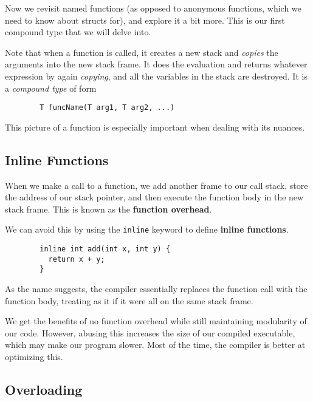 \documentclass{article}
\begin{document}
    Now we revisit named functions (as opposed to anonymous functions, which we need to know about structs for), and explore it a bit more. This is our first compound type that we will delve into. 

    \begin{definition}
      Note that when a function is called, it creates a new stack and \textit{copies} the arguments into the new stack frame. It does the evaluation and returns whatever expression by again \textit{copying}, and all the variables in the stack are destroyed. It is a \textit{compound type} of form 
      \begin{lstlisting}
        T funcName(T arg1, T arg2, ...)
      \end{lstlisting}
    \end{definition}

    This picture of a function is especially important when dealing with its nuances. 
  
  \subsection{Inline Functions} 

    When we make a call to a function, we add another frame to our call stack, store the address of our stack pointer, and then execute the function body in the new stack frame. This is known as the \textbf{function overhead}. 

    \begin{definition}
      We can avoid this by using the \texttt{inline} keyword to define \textbf{inline functions}. 
      \begin{lstlisting}
        inline int add(int x, int y) {
          return x + y; 
        }
      \end{lstlisting}
      As the name suggests, the compiler essentially replaces the function call with the function body, treating as it if it were all on the same stack frame. 
    \end{definition}

    We get the benefits of no function overhead while still maintaining modularity of our code. However, abusing this increases the size of our compiled executable, which may make our program slower. Most of the time, the compiler is better at optimizing this.  

  \subsection{Overloading} 
\end{document}
